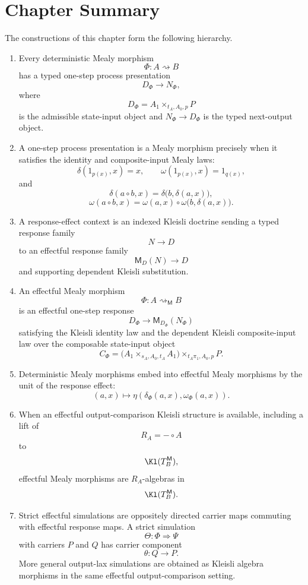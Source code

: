 \section{Chapter Summary}
\label{sec:effectful-cybernetic-summary}

The constructions of this chapter form the following hierarchy.

\begin{enumerate}
\item Every deterministic Mealy morphism
\[
\Phi:A\rightsquigarrow B
\]
has a typed one-step process presentation
\[
D_\Phi\to N_\Phi,
\]
where
\[
D_\Phi=A_1\times_{t_A,A_0,p}P
\]
is the admissible state-input object and \(N_\Phi\to D_\Phi\) is the typed next-output object.

\item A one-step process presentation is a Mealy morphism precisely when it satisfies the identity
and composite-input Mealy laws:
\[
\delta(1_{p(x)},x)=x,
\qquad
\omega(1_{p(x)},x)=1_{q(x)},
\]
and
\[
\delta(a\circ b,x)
=
\delta\bigl(b,\delta(a,x)\bigr),
\]
\[
\omega(a\circ b,x)
=
\omega(a,x)\circ
\omega\bigl(b,\delta(a,x)\bigr).
\]

\item A response-effect context is an indexed Kleisli doctrine sending a typed response family
\[
N\to D
\]
to an effectful response family
\[
\mathsf M_D(N)\to D
\]
and supporting dependent Kleisli substitution.

\item An effectful Mealy morphism
\[
\Phi:A\rightsquigarrow_{\mathsf M}B
\]
is an effectful one-step response
\[
D_\Phi\to\mathsf M_{D_\Phi}(N_\Phi)
\]
satisfying the Kleisli identity law and the dependent Kleisli composite-input law over the
composable state-input object
\[
C_\Phi
=
\bigl(A_1\times_{s_A,A_0,t_A}A_1\bigr)
\times_{t_A\pi_1,A_0,p}
P .
\]

\item Deterministic Mealy morphisms embed into effectful Mealy morphisms by the unit of the
response effect:
\[
(a,x)\mapsto
\eta(\delta_\Phi(a,x),\omega_\Phi(a,x)).
\]

\item When an effectful output-comparison Kleisli structure is available, including a lift of
\[
R_A=-\circ A
\]
to
\[
\Kl(T_B^{\mathsf M}),
\]
effectful Mealy morphisms are \(R_A\)-algebras in
\[
\Kl(T_B^{\mathsf M}).
\]

\item Strict effectful simulations are oppositely directed carrier maps commuting with effectful
response maps.  A strict simulation
\[
\Theta:\Phi\Rightarrow\Psi
\]
with carriers \(P\) and \(Q\) has carrier component
\[
\theta:Q\to P.
\]
More general output-lax simulations are obtained as Kleisli algebra morphisms in the same
effectful output-comparison setting.


\end{enumerate}
